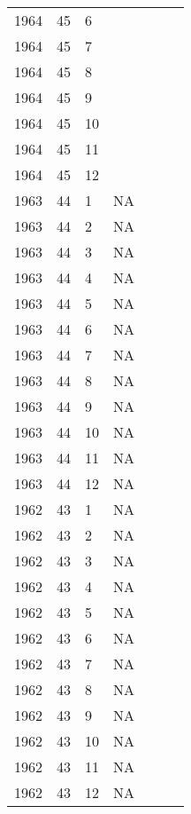\begin{longtable}{ |l|l|l|l|p{2.7cm}|l|p{2cm}| }
 1964 & 45 &     6 &         &                &  & \\
 1964 & 45 &     7 &         &                &  & \\
 1964 & 45 &     8 &         &                &  & \\
 1964 & 45 &     9 &         &                &  & \\
 1964 & 45 &    10 &         &                &   & \\
 1964 & 45 &    11 &         &                &  & \\
 1964 & 45 &    12 &         &                &  & \\
 1963 & 44 &     1 &      NA &                &  & \\
 1963 & 44 &     2 &      NA &                &  & \\
 1963 & 44 &     3 &      NA &                &  & \\
 1963 & 44 &     4 &      NA &                &  & \\
 1963 & 44 &     5 &      NA &                &  & \\
 1963 & 44 &     6 &      NA &                &  & \\
 1963 & 44 &     7 &      NA &                &  & \\
 1963 & 44 &     8 &      NA &                &  & \\
 1963 & 44 &     9 &      NA &                &  & \\
 1963 & 44 &    10 &      NA &                &  & \\
 1963 & 44 &    11 &      NA &                &  & \\
 1963 & 44 &    12 &      NA &                &  & \\
 1962 & 43 &     1 &      NA &                &  & \\
 1962 & 43 &     2 &      NA &                &  & \\
 1962 & 43 &     3 &      NA &                &  & \\
 1962 & 43 &     4 &      NA &                &  & \\
 1962 & 43 &     5 &      NA &                &  & \\
 1962 & 43 &     6 &      NA &                &  & \\
 1962 & 43 &     7 &      NA &                &   & \\
 1962 & 43 &     8 &      NA &                &  & \\
 1962 & 43 &     9 &      NA &                &  & \\
 1962 & 43 &    10 &      NA &                &  & \\
 1962 & 43 &    11 &      NA &                &  & \\
 1962 & 43 &    12 &      NA &                &  & \\
\end{longtable}
